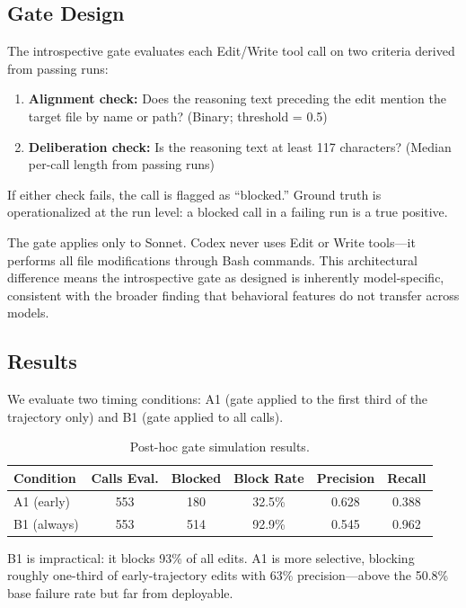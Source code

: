 \documentclass[11pt]{article}
\begin{document}
\subsection{Gate Design}

The introspective gate evaluates each Edit/Write tool call on two criteria derived from passing runs:

\begin{enumerate}[leftmargin=*]
\item \textbf{Alignment check:} Does the reasoning text preceding the edit mention the target file by name or path? (Binary; threshold = 0.5)
\item \textbf{Deliberation check:} Is the reasoning text at least 117 characters? (Median per-call length from passing runs)
\end{enumerate}

If either check fails, the call is flagged as ``blocked.''
Ground truth is operationalized at the run level: a blocked call in a failing run is a true positive.

The gate applies only to Sonnet.
Codex never uses Edit or Write tools---it performs all file modifications through Bash commands.
This architectural difference means the introspective gate as designed is inherently model-specific, consistent with the broader finding that behavioral features do not transfer across models.

\subsection{Results}

We evaluate two timing conditions: A1 (gate applied to the first third of the trajectory only) and B1 (gate applied to all calls).

\begin{table}[t]
\centering
\caption{Post-hoc gate simulation results.}
\label{tab:gate}
\small
\begin{tabular}{lccccc}
\toprule
\textbf{Condition} & \textbf{Calls Eval.} & \textbf{Blocked} & \textbf{Block Rate} & \textbf{Precision} & \textbf{Recall} \\
\midrule
A1 (early)  & 553 & 180 & 32.5\% & 0.628 & 0.388 \\
B1 (always) & 553 & 514 & 92.9\% & 0.545 & 0.962 \\
\bottomrule
\end{tabular}
\end{table}

B1 is impractical: it blocks 93\% of all edits.
A1 is more selective, blocking roughly one-third of early-trajectory edits with 63\% precision---above the 50.8\% base failure rate but far from deployable.
\end{document}
